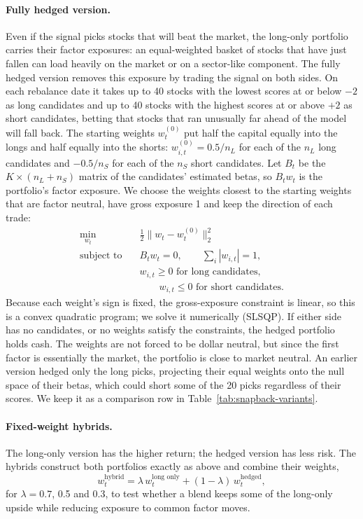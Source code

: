 \documentclass[11pt,letterpaper]{article}
\begin{document}
\paragraph{Fully hedged version.} Even if the signal picks stocks that will beat the market, the
long-only portfolio carries their factor exposures: an equal-weighted basket of stocks that have
just fallen can load heavily on the market or on a sector-like component. The fully hedged
version removes this exposure by trading the signal on both sides. On each rebalance date it
takes up to 40 stocks with the lowest scores at or below $-2$ as long candidates and up to 40
stocks with the highest scores at or above $+2$ as short candidates, betting that stocks that
ran unusually far ahead of the model will fall back. The starting weights $w^{(0)}_t$ put half
the capital equally into the longs and half equally into the shorts: $w^{(0)}_{i,t} = 0.5 / n_L$
for each of the $n_L$ long candidates and $-0.5 / n_S$ for each of the $n_S$ short candidates.
Let $B_t$ be the $K \times (n_L + n_S)$ matrix of the candidates' estimated betas, so $B_t w_t$
is the portfolio's factor exposure. We choose the weights closest to the starting weights that
are factor neutral, have gross exposure 1 and keep the direction of each trade:
\[
    \begin{aligned}
        \min_{w_t} \quad & \tfrac{1}{2} \lVert w_t - w^{(0)}_t \rVert_2^2 \\
        \text{subject to} \quad & B_t w_t = 0, \qquad \textstyle\sum_i |w_{i,t}| = 1, \\
        & w_{i,t} \ge 0 \text{ for long candidates}, \\
        & \qquad w_{i,t} \le 0 \text{ for short candidates}.
    \end{aligned}
\]
Because each weight's sign is fixed, the gross-exposure constraint is linear, so this is a
convex quadratic program; we solve it numerically (SLSQP). If either side has no candidates, or
no weights satisfy the constraints, the hedged portfolio holds cash. The weights are not forced
to be dollar neutral, but since the first factor is essentially the market, the portfolio is
close to market neutral. An earlier version hedged only the long picks, projecting their equal
weights onto the null space of their betas, which could short some of the 20 picks regardless of
their scores. We keep it as a comparison row in Table~\ref{tab:snapback-variants}.

\paragraph{Fixed-weight hybrids.} The long-only version has the higher return; the hedged
version has less risk. The hybrids construct both portfolios exactly as above and combine their
weights,
\[
    w_t^{\text{hybrid}} = \lambda\, w_t^{\text{long only}} + (1 - \lambda)\, w_t^{\text{hedged}},
\]
for $\lambda = 0.7$, 0.5 and 0.3, to test whether a blend keeps some of the long-only upside
while reducing exposure to common factor moves.
\end{document}
